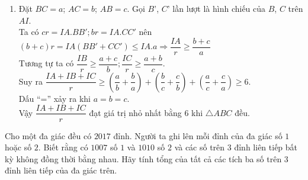 \begin{ex}
{\begin{enumerate}
			Suy ra $NK.CD=NP.DB\Rightarrow \dfrac{NP}{NK}=\dfrac{DC}{DB}\Leftrightarrow \dfrac{NP}{DC}=\dfrac{NK}{DB}=\dfrac{NP+NK}{DC+DB}=\dfrac{PK}{BC}$\\
			Vì $PK\parallel BC$ nên theo định lí Talet ta có $\dfrac{NK}{EC}=\dfrac{AK}{AC}=\dfrac{PK}{BC}$.\\
			Suy ra $\dfrac{NK}{EC}=\dfrac{NK}{DB}\Rightarrow EC=DB$.
	\item Đặt $BC = a$; $AC = b$; $AB = c$. Gọi $B’$, $C’$ lần lượt là hình chiếu của $B$, $C$ trên $AI$.\\
			Ta có $cr=IA.BB';br=IA.CC'$ nên $(b+c)r=IA(BB'+CC')\le IA.a\Rightarrow \dfrac{IA}{r}\ge \dfrac{b+c}{a}$\\
			Tương tự ta có $\dfrac{IB}{r}\ge \dfrac{a+c}{b};\dfrac{IC}{r}\ge \dfrac{a+b}{c}$.\\
			Suy ra $\dfrac{IA+IB+IC}{r}\ge \left(\dfrac{a}{b}+\dfrac{b}{a}\right)+\left(\dfrac{b}{c}+\dfrac{c}{b}\right)+\left(\dfrac{a}{c}+\dfrac{c}{a}\right)\ge 6$.\\
			Dấu ``='' xảy ra khi $a=b=c$.\\
			Vậy $\dfrac{IA+IB+IC}{r}$ đạt giá trị nhỏ nhất bằng 6 khi $\triangle ABC$ đều.
\end{enumerate}
}
\end{ex}

\begin{ex}%
Cho một đa giác đều có $2017$ đỉnh. Người ta ghi lên mỗi đỉnh của đa giác số $1$ hoặc số $2$. Biết rằng có $1007$ số $1$ và $1010$ số $2$ và các số trên $3$ đỉnh liên tiếp bất kỳ không đồng thời bằng nhau. Hãy tính tổng của tất cả các tích ba số trên $3$ đỉnh liên tiếp của đa giác trên.
\end{ex}

